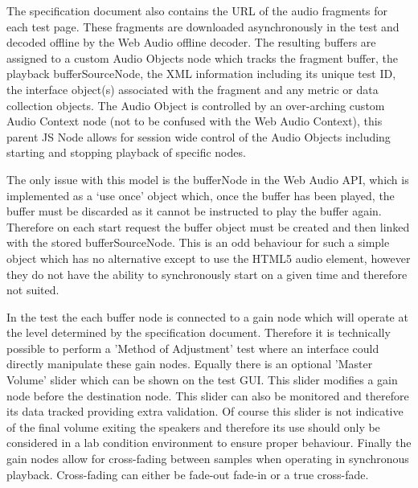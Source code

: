 \documentclass{sig-alternate}
\begin{document}
    The specification document also contains the URL of the audio fragments for each test page. These fragments are downloaded asynchronously in the test and decoded offline by the Web Audio offline decoder. The resulting buffers are assigned to a custom Audio Objects node which tracks the fragment buffer, the playback bufferSourceNode, the XML information including its unique test ID, the interface object(s) associated with the fragment and any metric or data collection objects. The Audio Object is controlled by an over-arching custom Audio Context node (not to be confused with the Web Audio Context), this parent JS Node allows for session wide control of the Audio Objects including starting and stopping playback of specific nodes.
    
    The only issue with this model is the bufferNode in the Web Audio API, which is implemented as a `use once' object which, once the buffer has been played, the buffer must be discarded as it cannot be instructed to play the buffer again. Therefore on each start request the buffer object must be created and then linked with the stored bufferSourceNode. This is an odd behaviour for such a simple object which has no alternative except to use the HTML5 audio element, however they do not have the ability to synchronously start on a given time and therefore not suited.
    
    In the test the each buffer node is connected to a gain node which will operate at the level determined by the specification document. Therefore it is technically possible to perform a 'Method of Adjustment' test where an interface could directly manipulate these gain nodes. Equally there is an optional 'Master Volume' slider which can be shown on the test GUI. This slider modifies a gain node before the destination node. This slider can also be monitored and therefore its data tracked providing extra validation. Of course this slider is not indicative of the final volume exiting the speakers and therefore its use should only be considered in a lab condition environment to ensure proper behaviour. Finally the gain nodes allow for cross-fading between samples when operating in synchronous playback. Cross-fading can either be fade-out fade-in or a true cross-fade.
    
\end{document}
